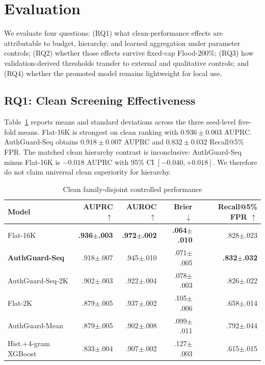 \documentclass[conference]{IEEEtran}
\begin{document}
\section{Evaluation}
\label{sec:evaluation}

We evaluate four questions: (RQ1) what clean-performance effects are attributable to budget, hierarchy, and learned aggregation under parameter controls; (RQ2) whether those effects survive fixed-cap Flood-200\%; (RQ3) how validation-derived thresholds transfer to external and qualitative controls; and (RQ4) whether the promoted model remains lightweight for local use.

\subsection{RQ1: Clean Screening Effectiveness}

Table~\ref{tab:clean} reports means and standard deviations across the three seed-level five-fold means. Flat-16K is strongest on clean ranking with $0.936\pm0.003$ AUPRC. AuthGuard-Seq obtains $0.918\pm0.007$ AUPRC and $0.832\pm0.032$ Recall@5\% FPR. The matched clean hierarchy contrast is inconclusive: AuthGuard-Seq minus Flat-16K is $-0.018$ AUPRC with 95\% CI $[-0.040,+0.018]$. We therefore do not claim universal clean superiority for hierarchy.

\begin{table}[t]
\centering
\caption{Clean family-disjoint controlled performance}
\label{tab:clean}
\scriptsize
\begin{tabularx}{\columnwidth}{@{}X r r r r@{}}
\toprule
Model & AUPRC $\uparrow$ & AUROC $\uparrow$ & Brier $\downarrow$ & Recall@5\% FPR $\uparrow$ \\
\midrule
Flat-16K & \textbf{.936$\pm$.003} & \textbf{.972$\pm$.002} & \textbf{.064$\pm$.010} & .828$\pm$.023 \\
\textbf{AuthGuard-Seq} & .918$\pm$.007 & .945$\pm$.010 & .071$\pm$.005 & \textbf{.832$\pm$.032} \\
AuthGuard-Seq-2K & .902$\pm$.003 & .922$\pm$.004 & .078$\pm$.003 & .826$\pm$.022 \\
Flat-2K & .879$\pm$.005 & .937$\pm$.002 & .105$\pm$.006 & .658$\pm$.014 \\
AuthGuard-Mean & .879$\pm$.005 & .902$\pm$.008 & .099$\pm$.011 & .792$\pm$.044 \\
Hist.+4-gram XGBoost & .833$\pm$.004 & .907$\pm$.002 & .127$\pm$.003 & .615$\pm$.015 \\
\bottomrule
\end{tabularx}
\end{table}
\end{document}
